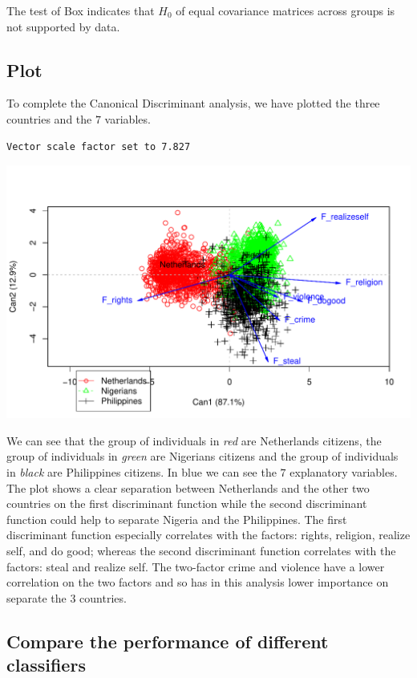 \documentclass[
  11pt,
]{article}
\begin{document}
The test of Box indicates that \(H_{0}\) of equal covariance matrices across groups is not supported by data.

\newpage

\hypertarget{plot}{%
\subsection{Plot}\label{plot}}

To complete the Canonical Discriminant analysis, we have plotted the three countries and the \(7\) variables.

\begin{verbatim}
Vector scale factor set to 7.827
\end{verbatim}

\includegraphics{1_Task_files/figure-latex/Task_1_4-1.pdf}

We can see that the group of individuals in \emph{red} are Netherlands citizens, the group of individuals in \emph{green} are Nigerians citizens and the group of individuals in \emph{black} are Philippines citizens. In blue we can see the \(7\) explanatory variables. The plot shows a clear separation between Netherlands and the other two countries on the first discriminant function while the second discriminant function could help to separate Nigeria and the Philippines.
The first discriminant function especially correlates with the factors: rights, religion, realize self, and do good; whereas the second discriminant function correlates with the factors: steal and realize self. The two-factor crime and violence have a lower correlation on the two factors and so has in this analysis lower importance on separate the \(3\) countries.

\hypertarget{compare-the-performance-of-different-classifiers}{%
\subsection{Compare the performance of different classifiers}\label{compare-the-performance-of-different-classifiers}}
\end{document}
